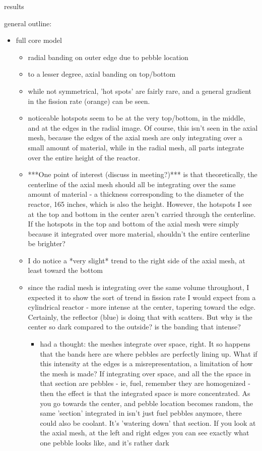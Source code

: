 results

general outline:

\begin{itemize}
\item full core model
	\begin{itemize}
	\item radial banding on outer edge due to pebble location
	\item to a lesser degree, axial banding on top/bottom
	\item while not symmetrical, 'hot spots' are fairly rare, and a general gradient in the fission rate (orange) can be seen.
	\item noticeable hotspots seem to be at the very top/bottom, in the middle, and at the edges in the radial image.  Of course, this isn't seen in the axial mesh, because the edges of the axial mesh are only integrating over a small amount of material, while in the radial mesh, all parts integrate over the entire height of the reactor.
	\item ***One point of interest (discuss in meeting?)*** is that theoretically, the centerline of the axial mesh should all be integrating over the same amount of material - a thickness corresponding to the diameter of the reactor, 165 inches, which is also the height.  However, the hotspots I see at the top and bottom in the center aren't carried through the centerline.  If the hotspots in the top and bottom of the axial mesh were simply because it integrated over more material, shouldn't the entire centerline be brighter?
	\item I do notice a *very slight* trend to the right side of the axial mesh, at least toward the bottom
	\item since the radial mesh is integrating over the same volume throughout, I expected it to show the sort of trend in fission rate I would expect from a cylindrical reactor - more intense at the center, tapering toward the edge.  Certainly, the reflector (blue) is doing that with scatters.  But why is the center so dark compared to the outside?  is the banding that intense?
		\begin{itemize}
		\item had a thought: the meshes integrate over space, right.  It so happens that the bands here are where pebbles are perfectly lining up.  What if this intensity at the edges is a misrepresentation, a limitation of how the mesh is made?  If integrating over space, and all the the space in that section are pebbles - ie, fuel, remember they are homogenized - then the effect is that the integrated space is more concentrated.  As you go towards the center, and pebble location becomes random, the same 'section' integrated in isn't just fuel pebbles anymore, there could also be coolant.  It's 'watering down' that section.  If you look at the axial mesh, at the left and right edges you can see exactly what one pebble looks like, and it's rather dark
		\end{itemize}
	\end{itemize}
	

\end{itemize}
